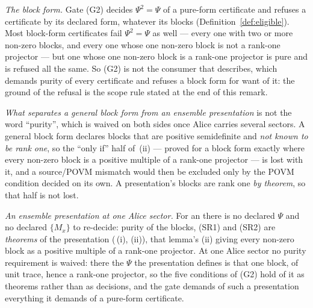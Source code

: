\begin{remark}\label{rem:gate-by-certificate-form}
\emph{The block form.} Gate (G2) decides $\Psi^2=\Psi$ of a pure-form
certificate and refuses a  certificate by its
declared form, whatever its blocks (Definition~\ref{def:eligible}). Most
block-form certificates fail $\Psi^2=\Psi$ as well --- every one with two or
more non-zero blocks, and every one whose one non-zero block is not a
rank-one projector --- but one whose one non-zero block is a rank-one
projector is pure and is refused all the same. So (G2) is not the consumer that
 describes, which demands purity of
every certificate and refuses a block form for want of it: the ground of the
refusal is the scope rule stated at the end of this remark.

\emph{What separates a general block form from an ensemble presentation} is
not the word ``purity'', which is waived on both sides once Alice carries
several sectors. A general block form declares blocks that are positive
semidefinite and \emph{not known to be rank one}, so the ``only if'' half of
\,(ii) --- proved for a block
form exactly where every non-zero block is a positive multiple of a rank-one
projector --- is lost with it, and a source/POVM mismatch would then be
excluded only by the POVM condition decided on its own. A presentation's
blocks are rank one \emph{by theorem}, so that half is not lost.

\emph{An ensemble presentation at one Alice sector.} For an  there is no declared $\Psi$ and no declared $\{M_x\}$ to
re-decide: purity of the blocks, (SR1) and (SR2) are \emph{theorems} of the
presentation (\,(i), (ii)), that
lemma's (ii) giving every non-zero block as a positive multiple of a rank-one
projector. At one Alice sector no purity requirement is waived: there the
$\Psi$ the presentation defines is that one block, of unit trace, hence a
rank-one projector, so the five conditions of (G2) hold of it as theorems
rather than as decisions, and the gate demands of such a presentation
everything it demands of a pure-form certificate.


\end{remark}
